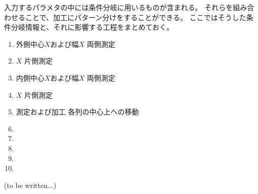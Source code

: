 

入力するパラメタの中には条件分岐に用いるものが含まれる。
それらを組み合わせることで、加工にパターン分けをすることができる。
ここではそうした条件分岐情報と、それに影響する工程をまとめておく。


\begin{enumerate}[label=\sarrow]
\item 外側中心$X$および幅$X$ 両側測定
\item \KeywayCenter$X$ 片側測定
\item 内側中心$X$および幅$X$ 両側測定
\item \OutcutCenter$X$ 片側測定
\item \Dimple 測定および加工 各列の中心上への移動
\item \CurvedOutcutMilling
\item \KeywayMilling
\item \EndFaceOutChamferMilling
\item \EndFaceInChamferMilling
\item \ReliefGrooveMilling
\end{enumerate}


(to be written...)


\clearrightpage
